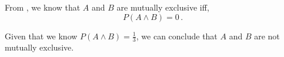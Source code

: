 \begin{subquestions}
\begin{subsubquestions}
\end{subsubquestions}


\subquestion

From , we know that $A$ and $B$ are mutually exclusive iff,
\begin{equation}
	P(A \land B) = 0 \,.
\end{equation}

Given that we know $P(A \land B) = \frac{1}{3}$, we can conclude that $A$ and $B$ are not mutually exclusive.

\end{subquestions}